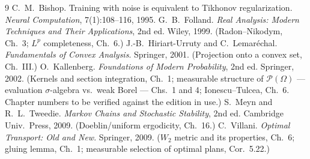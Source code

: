 \documentclass[11pt]{article}
\theoremstyle{definitionbreak}
\theoremstyle{plainbreak}
\theoremstyle{remarkbreak}
\newcommand{\cP}{\mathcal{P}}
\newcommand{\Om}{\Omega}
\begin{document}
\begin{thebibliography}{9}
 C.~M.~Bishop. Training with noise is equivalent to Tikhonov regularization.
  \emph{Neural Computation}, 7(1):108--116, 1995.
 G.~B.~Folland. \emph{Real Analysis: Modern Techniques and Their Applications},
  2nd ed. Wiley, 1999. (Radon--Nikodym, Ch.~3; $L^p$ completeness, Ch.~6.)
 J.-B.~Hiriart-Urruty and C.~Lemar\'echal.
  \emph{Fundamentals of Convex Analysis}. Springer, 2001. (Projection onto a convex set, Ch.~III.)
 O.~Kallenberg. \emph{Foundations of Modern Probability}, 2nd ed. Springer, 2002.
  (Kernels and section integration, Ch.~1; measurable structure of $\cP(\Om)$ --- evaluation
  $\sigma$-algebra vs.\ weak Borel --- Chs.~1 and 4; Ionescu--Tulcea, Ch.~6. Chapter numbers to be
  verified against the edition in use.)
 S.~Meyn and R.~L.~Tweedie.
  \emph{Markov Chains and Stochastic Stability}, 2nd ed. Cambridge Univ.\ Press, 2009.
  (Doeblin/uniform ergodicity, Ch.~16.)
 C.~Villani. \emph{Optimal Transport: Old and New}. Springer, 2009.
  ($W_2$ metric and its properties, Ch.~6; gluing lemma, Ch.~1; measurable selection of optimal
  plans, Cor.~5.22.)
\end{thebibliography}
\end{document}
